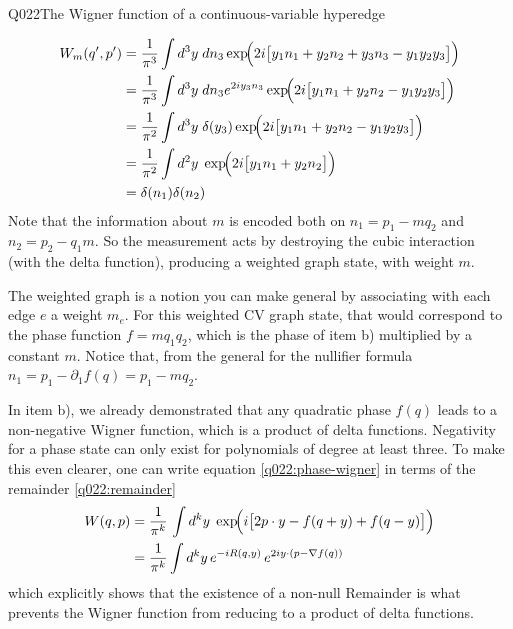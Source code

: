 \begin{entry}{Q022}{The Wigner function of a continuous-variable hyperedge}
\begin{solution}[Part (e)]
\begin{equation}
    \begin{split}
    W_m(q',p')&=\frac{1}{\pi^{3}}\int d^{3}y\;dn_3
          \exp\!\Bigl(2i\bigl[ y_1n_1 + y_2n_2 + y_3n_3-  y_1y_2y_3 \bigr]\Bigr)\\
        &=\frac{1}{\pi^{3}}\int d^{3}y\;dn_3 e^{2iy_3n_3}
          \exp\!\Bigl(2i\bigl[ y_1n_1 + y_2n_2 -  y_1y_2y_3 \bigr]\Bigr)\\
    &= \frac{1}{\pi^{2}}\int d^{3}y\;\delta(y_3)
          \exp\!\Bigl(2i\bigl[ y_1n_1 + y_2n_2 -  y_1y_2y_3 \bigr]\Bigr)\\
          &=  \frac{1}{\pi^{2}}\int d^{2}y\;
          \exp\!\Bigl(2i\bigl[ y_1n_1 + y_2n_2  \bigr]\Bigr)\\
          &= \delta(n_1)\delta(n_2)
    \end{split}
\end{equation}
Note that the information about $m$ is encoded both on $n_1=p_1-mq_2$ and $n_2=p_2 - q_1m$. So the measurement acts by destroying the cubic interaction (with the delta function), producing a weighted graph state, with weight $m$. 

The weighted graph is a notion you can make general by associating with each edge $e$ a weight $m_e$. For this weighted CV graph state, that would correspond to the phase function $f=mq_1q_2$, which is the phase of item b) multiplied by a constant $m$. Notice that, from the general for the nullifier formula $n_1 = p_1 - \partial_1f(q)=p_1-mq_2$.



In item b), we already demonstrated that any quadratic phase $f(q)$ leads to a non-negative Wigner function, which is a product of delta functions. Negativity for a phase state can only exist for polynomials of degree at least three. To make this even clearer, one can write equation \eqref{q022:phase-wigner} in terms of the remainder \eqref{q022:remainder}
\begin{equation}
\begin{split}
    W(q,p)
    &= \frac{1}{\pi^{k}}\, \int d^{k}y\;
          \exp\!\Bigl(i\bigl[2p\cdot y-f(q+y)+f(q-y)\bigr]\Bigr)\\
    &= \frac{1}{\pi^{k}} \int d^{k}y\,
          e^{-iR(q,y)}\, e^{2iy\cdot(p-\nabla f(q))}
\end{split}
\label{q022:wigner-remainder}
\end{equation}
which explicitly shows that the existence of a non-null Remainder is what prevents the Wigner function from reducing to a product of delta functions.


\end{solution}
\end{entry}
